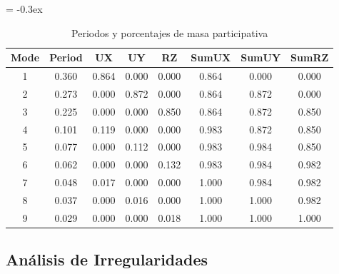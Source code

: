 \documentclass{article}%
\begin{document}
\begin{table}[h!]%
\extrarowheight = -0.3ex%
\renewcommand{\arraystretch}{1.3}%
\centering%
\caption{Periodos y porcentajes de masa participativa}%
\begin{tabular}{cccccccc}
\toprule
Mode & Period & UX & UY & RZ & SumUX & SumUY & SumRZ \\
\midrule
1 & 0.360 & 0.864 & 0.000 & 0.000 & 0.864 & 0.000 & 0.000 \\
2 & 0.273 & 0.000 & 0.872 & 0.000 & 0.864 & 0.872 & 0.000 \\
3 & 0.225 & 0.000 & 0.000 & 0.850 & 0.864 & 0.872 & 0.850 \\
4 & 0.101 & 0.119 & 0.000 & 0.000 & 0.983 & 0.872 & 0.850 \\
5 & 0.077 & 0.000 & 0.112 & 0.000 & 0.983 & 0.984 & 0.850 \\
6 & 0.062 & 0.000 & 0.000 & 0.132 & 0.983 & 0.984 & 0.982 \\
7 & 0.048 & 0.017 & 0.000 & 0.000 & 1.000 & 0.984 & 0.982 \\
8 & 0.037 & 0.000 & 0.016 & 0.000 & 1.000 & 1.000 & 0.982 \\
9 & 0.029 & 0.000 & 0.000 & 0.018 & 1.000 & 1.000 & 1.000 \\
\bottomrule
\end{tabular}
%
\end{table}

%
\subsection{Análisis de Irregularidades}%
\label{subsec:AnlisisdeIrregularidades}%

%
\end{document}
